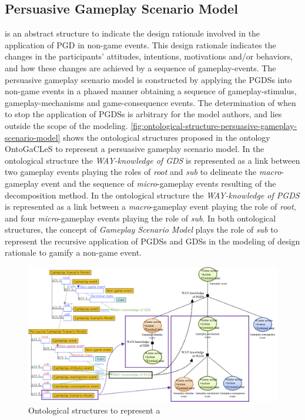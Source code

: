 \subsection{Persuasive Gameplay Scenario Model}
\label{subsec:persuasive-gameplay-scenario-model}

 is an abstract structure to indicate the design rationale involved in the application of PGD in non-game events.
This design rationale indicates the changes in the participants' attitudes, intentions, motivations and/or behaviors, and how these changes are achieved by a sequence of gameplay-events.
The persuasive gameplay scenario model is constructed by applying the PGDSs into non-game events in a phased manner obtaining a sequence of gameplay-stimulus, gameplay-mechanisms and game-consequence events.
The determination of when to stop the application of PGDSs is arbitrary for the model authors, and lies outside the scope of the modeling.
\autoref{fig:ontological-structure-persuasive-gameplay-scenario-model} shows the ontological structures proposed in the ontology OntoGaCLeS to represent a persuasive gameplay scenario model.
In the ontological structure  the \emph{WAY-knowledge of GDS} is represented as a link between two gameplay events playing the roles of \emph{root} and \emph{sub} to delineate the \emph{macro}-gameplay event and the sequence of \emph{micro}-gameplay events resulting of the decomposition method.
In the ontological structure  the \emph{WAY-knowledge of PGDS} is represented as a link between a \emph{macro}-gameplay event playing the role of \emph{root}, and four \emph{micro}-gameplay events playing the role of \emph{sub}.
In both ontological structures, the concept of \emph{Gameplay Scenario Model} plays the role of \emph{sub} to represent the recursive application of PGDSs and GDSs in the modeling of design rationale to gamify a non-game event.

\begin{figure}[!htb]
 \caption[Ontological structures to represent a persuasive gameplay scenario model]{Ontological structures to represent a }
 \label{fig:ontological-structure-persuasive-gameplay-scenario-model}
 \centering
 \includegraphics[width=1\textwidth]{images/chap-ontogacles2/ontological-structure-persuasive-gameplay-scenario-model.png}
 \fautor
\end{figure}

